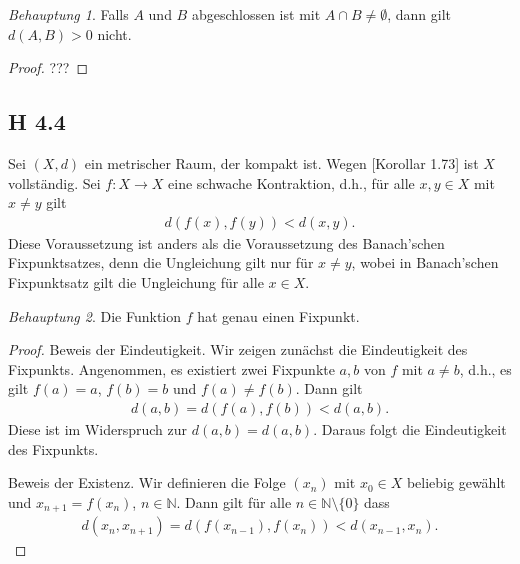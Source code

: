 \documentclass[draft,a5paper]{article}
\theoremstyle{remark}
\newtheorem*{beh}{Behauptung}
\begin{document}
\begin{beh}
  Falls \(A\) und \(B\) abgeschlossen ist mit
  \(A \cap B \ne \emptyset\), dann gilt \(d(A, B) > 0\) nicht.
\end{beh}

\begin{proof}
  ???
\end{proof}

\subsection*{H 4.4}

Sei \((X, d)\) ein metrischer Raum, der kompakt ist. Wegen [Korollar
1.73] ist \(X\) vollständig. Sei \(f\colon X \to X\) eine schwache
Kontraktion, d.h., für alle \(x, y \in X\) mit \(x \ne y\) gilt
\begin{align*}
  d(f(x), f(y)) < d(x, y).
\end{align*}
Diese Voraussetzung ist anders als die Voraussetzung des Banach'schen
Fixpunktsatzes, denn die Ungleichung gilt nur für \(x \ne y\), wobei in
Banach'schen Fixpunktsatz gilt die Ungleichung für alle \(x \in X\).

\begin{beh}
  Die Funktion \(f\) hat genau einen Fixpunkt.
\end{beh}

\begin{proof}
  Beweis der Eindeutigkeit. Wir zeigen zunächst die Eindeutigkeit des
  Fixpunkts.  Angenommen, es existiert zwei Fixpunkte \(a, b\) von
  \(f\) mit \(a \ne b\), d.h., es gilt \(f(a) = a\), \(f(b) = b\) und
  \(f(a) \ne f(b)\).  Dann gilt
  \begin{align*}
    d(a, b) = d(f(a), f(b)) < d(a, b).
  \end{align*}
  Diese ist im Widerspruch zur \(d(a, b) = d(a, b)\).  Daraus folgt
  die Eindeutigkeit des Fixpunkts.

  Beweis der Existenz.  Wir definieren die Folge \((x_{n})\) mit
  \(x_{0} \in X\) beliebig gewählt und \(x_{n+1} = f(x_{n})\), \(n \in
  \mathbb{N}\).  Dann gilt für alle \(n \in \mathbb{N} \setminus \{0\}\) dass
  \begin{align*}
    d(x_{n}, x_{n+1}) = d(f(x_{n-1}), f(x_{n})) < d(x_{n-1}, x_{n}).
  \end{align*}
\end{proof}
\end{document}
